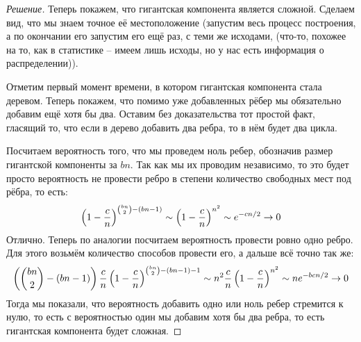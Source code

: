 \documentclass[12pt,a4paper]{extarticle}
\begin{document}
\begin{proof}[Решение]
		\vspace{\baselineskip}
		
		
		
		
		Теперь покажем, что гигантская компонента является сложной. 
		Сделаем вид, что мы знаем точное её местоположение (запустим весь процесс построения, а по окончании его запустим его ещё раз, с теми же исходами, (что-то, похожее на то, как в статистике -- имеем лишь  исходы, но у нас есть информация о распределении)). 
		
		Отметим первый момент времени, в котором гигантская компонента стала деревом.
		Теперь покажем, что помимо уже добавленных рёбер мы обязательно добавим ещё хотя бы два. Оставим без доказательства тот простой факт, гласящий то, что если в дерево добавить два ребра, то в нём будет два цикла. 
		
		Посчитаем вероятность того, что мы проведем ноль ребер, обозначив размер гигантской компоненты за $bn$. Так как мы их проводим независимо, то это будет просто вероятность не провести ребро в степени количество свободных мест под рёбра, то есть:
		\[
			\left(1 - {c\over n}\right)^{\binom{bn}{2} - (bn-1)} \sim \left(1 - {c\over n}\right)^{n^2} \sim e^{-cn/2} \rightarrow 0
		\]
	 	Отлично. Теперь по аналогии посчитаем вероятность провести ровно одно ребро. Для этого возьмём количество способов провести его, а дальше всё точно так же:
		\[
			\left(\binom{bn}{2} - (bn - 1)\right){c \over n}\left(1 - {c\over n}\right)^{\binom{bn}{2} - (bn-1) - 1} \sim n^2{c\over n}\left(1 - {c\over n}\right)^{n^2} \sim ne^{-bcn/2} \rightarrow 0
		\]
		Тогда мы показали, что вероятность добавить одно или ноль ребер стремится к нулю, то есть с вероятностью один мы добавим хотя бы два ребра, то есть гигантская компонента будет сложная.
	
	\end{proof}	
	
	
	
	\newpage
	
	
	
	
	
	
	
\end{document}
